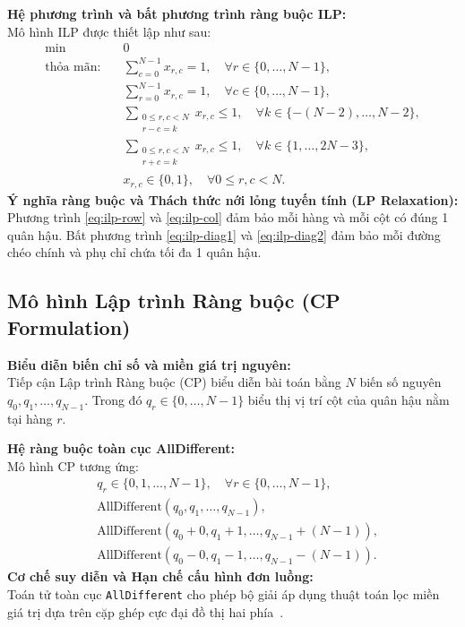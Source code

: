 \documentclass[a4paper,fleqn]{cas-sc}
\begin{document}
\noindent\textbf{Hệ phương trình và bất phương trình ràng buộc ILP:}\\
Mô hình ILP được thiết lập như sau:
\begin{align}
    \min \quad & 0 \label{eq:ilp-obj}\\
    \text{thỏa mãn:} \quad
    & \sum_{c=0}^{N-1} x_{r,c} = 1, \quad \forall r \in \{0, \dots, N-1\}, \label{eq:ilp-row}\\
    & \sum_{r=0}^{N-1} x_{r,c} = 1, \quad \forall c \in \{0, \dots, N-1\}, \label{eq:ilp-col}\\
    & \sum_{\substack{0 \le r, c < N \\ r - c = k}} x_{r,c} \le 1, \quad \forall k \in \{-(N-2), \dots, N-2\}, \label{eq:ilp-diag1}\\
    & \sum_{\substack{0 \le r, c < N \\ r + c = k}} x_{r,c} \le 1, \quad \forall k \in \{1, \dots, 2N-3\}, \label{eq:ilp-diag2}\\
    & x_{r,c} \in \{0, 1\}, \quad \forall 0 \le r, c < N. \label{eq:ilp-domain}
\end{align}
\noindent\textbf{Ý nghĩa ràng buộc và Thách thức nới lỏng tuyến tính (LP Relaxation):}\\
Phương trình \eqref{eq:ilp-row} và \eqref{eq:ilp-col} đảm bảo mỗi hàng và mỗi cột có đúng 1 quân hậu. Bất phương trình \eqref{eq:ilp-diag1} và \eqref{eq:ilp-diag2} đảm bảo mỗi đường chéo chính và phụ chỉ chứa tối đa 1 quân hậu.

\subsection{Mô hình Lập trình Ràng buộc (CP Formulation)}

\noindent\textbf{Biểu diễn biến chỉ số và miền giá trị nguyên:}\\
Tiếp cận Lập trình Ràng buộc (CP) biểu diễn bài toán bằng $N$ biến số nguyên $q_0, q_1, \dots, q_{N-1}$. Trong đó $q_r \in \{0, \dots, N-1\}$ biểu thị vị trí cột của quân hậu nằm tại hàng $r$.

\noindent\textbf{Hệ ràng buộc toàn cục AllDifferent:}\\
Mô hình CP tương ứng:
\begin{align}
    &q_r \in \{0, 1, \dots, N-1\}, \quad \forall r \in \{0, \dots, N-1\}, \\
    &\text{AllDifferent}(q_0, q_1, \dots, q_{N-1}), \label{eq:cp-col}\\
    &\text{AllDifferent}(q_0 + 0, q_1 + 1, \dots, q_{N-1} + (N-1)), \label{eq:cp-diag1}\\
    &\text{AllDifferent}(q_0 - 0, q_1 - 1, \dots, q_{N-1} - (N-1)). \label{eq:cp-diag2}
\end{align}
\noindent\textbf{Cơ chế suy diễn và Hạn chế cấu hình đơn luồng:}\\
Toán tử toàn cục \texttt{AllDifferent} cho phép bộ giải áp dụng thuật toán lọc miền giá trị dựa trên cặp ghép cực đại đồ thị hai phía~\cite{rossi2006handbook}.
\end{document}
